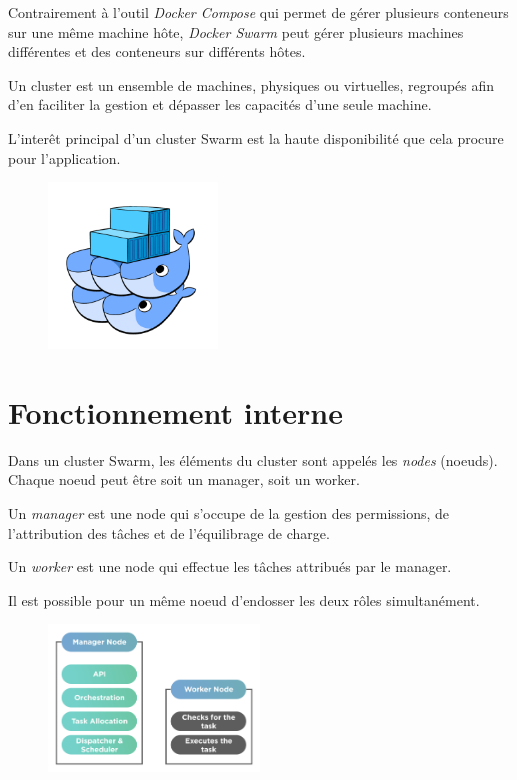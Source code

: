 Contrairement à l'outil \emph{Docker Compose} qui permet de gérer plusieurs conteneurs sur une même
machine hôte, \emph{Docker Swarm} peut gérer plusieurs machines différentes et des conteneurs sur
différents hôtes.

Un cluster est un ensemble de machines, physiques ou virtuelles, regroupés afin d'en faciliter la
gestion et dépasser les capacités d'une seule machine.

L’interêt principal d’un cluster Swarm est la haute disponibilité que cela procure pour
l’application.

\begin{figure}[h!]
    \centering
    \includegraphics[width=0.4\textwidth]{img/swarm}
\end{figure}

\section{Fonctionnement interne}

Dans un cluster Swarm, les éléments du cluster sont appelés les \emph{nodes} (noeuds).
Chaque noeud peut être soit un manager, soit un worker.

Un \emph{manager} est une node qui s'occupe de la gestion des permissions, de l'attribution des
tâches et de l'équilibrage de charge.

Un \emph{worker} est une node qui effectue les tâches attribués par le manager.

Il est possible pour un même noeud d’endosser les deux rôles simultanément.

\begin{figure}[h!]
    \centering
    \includegraphics[width=0.5\textwidth]{img/manager}
\end{figure}


